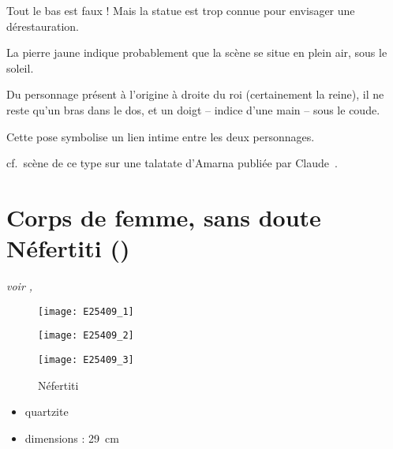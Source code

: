 \documentclass[dvipsnames,a4paper,twoside,10pt,openany,article]{memoir}
\begin{document}
Tout le bas est faux ! Mais la statue est trop connue pour envisager 
une dérestauration.

La pierre jaune indique probablement que la scène se situe en plein 
air, sous le soleil.

Du personnage présent à l'origine à droite du roi (certainement la 
reine), il ne reste qu'un bras dans le dos, et un doigt -- indice 
d'une main -- sous le coude.

Cette pose symbolise un lien intime entre les deux personnages.

\begin{remarque}
  cf.~scène de ce type sur une talatate d'Amarna publiée par 
  Claude~.
\end{remarque}

\chapter{Corps de femme, sans doute Néfertiti ()}
\label{sec:E25409}

\puceb{} \emph{voir , }
\bigskip

\begin{figure}[!h]
  \noi\begin{minipage}[m]{0.33\textwidth}
    \centerfloat
    \texttt{[image: E25409\_1]}
  \end{minipage}%
  \hspace{\fill}%
  \begin{minipage}[m]{0.33\textwidth}
    \centerfloat
    \texttt{[image: E25409\_2]}
  \end{minipage}%
  \hspace{\fill}%
  \begin{minipage}[m]{0.33\textwidth}
    \centerfloat
    \texttt{[image: E25409\_3]}
  \end{minipage}%
  \caption{Néfertiti }
  \label{fig:E25409}
\end{figure}

\begin{itemize}
  \item quartzite
  \item dimensions : \SI{29}{\cm}
\end{itemize}
\end{document}
